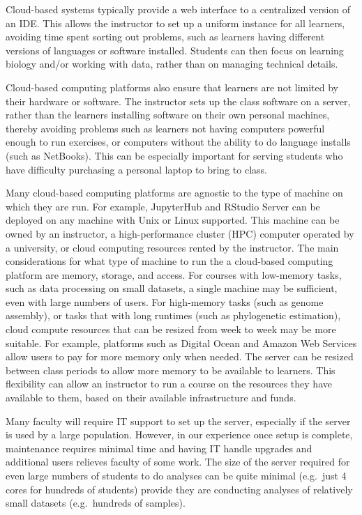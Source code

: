 Cloud-based systems typically provide a web interface to a centralized version of an IDE. This 
allows the instructor to set up a uniform instance for all learners, avoiding time spent sorting out problems, such as learners having different versions of languages or software installed.
Students can then focus on learning biology and/or working with data, rather than on managing technical details.

Cloud-based computing platforms also ensure that learners
are not limited by their hardware or software. The instructor sets up the class software on a server, rather than the learners installing software on their own personal machines, thereby avoiding problems such as learners not having computers powerful enough to run exercises, or computers without the ability to do language installs (such as NetBooks). This can be especially important for serving students who have difficulty purchasing a personal laptop to bring to class.

Many cloud-based computing platforms are agnostic to the type of machine on which they are run. 
For example, JupyterHub and RStudio Server can be deployed on any machine with Unix or Linux supported. 
This machine can be owned by an instructor, a high-performance cluster (HPC) computer operated by a university, or cloud 
computing resources rented by the instructor.
The main considerations for what type of machine to run the a cloud-based computing platform are memory, storage, and access.
For courses with low-memory tasks, such as data processing on small datasets, a single machine may be sufficient, even with large numbers of users.
For high-memory tasks (such as genome assembly), or tasks that with long runtimes (such as phylogenetic estimation), 
cloud compute resources that can be resized from week to week may be more suitable.
For example, platforms such as Digital Ocean and Amazon Web Services allow users to pay for more memory only when needed. 
The server can be resized between class periods to allow more memory to be available to learners.
This flexibility can allow an instructor to run a course on the resources they have available to them, based on their available infrastructure and funds.

Many faculty will require IT support to set up the server, especially if the server is used by a large population. However, in our experience once setup is complete, maintenance requires minimal time and having IT handle upgrades and additional users relieves faculty of some work. The size of the server required for even large numbers of students to do analyses can be quite minimal (e.g.\ just 4 cores for hundreds of students) provide they are conducting analyses of relatively small datasets (e.g.\ hundreds of samples). 

